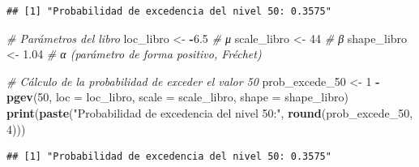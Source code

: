 \documentclass[
  20pt,
]{book}
\newenvironment{Shaded}{\begin{snugshade}}{\end{snugshade}}
\newcommand{\AttributeTok}[1]{\textcolor[rgb]{0.13,0.29,0.53}{#1}}
\newcommand{\CommentTok}[1]{\textcolor[rgb]{0.56,0.35,0.01}{\textit{#1}}}
\newcommand{\DecValTok}[1]{\textcolor[rgb]{0.00,0.00,0.81}{#1}}
\newcommand{\FloatTok}[1]{\textcolor[rgb]{0.00,0.00,0.81}{#1}}
\newcommand{\FunctionTok}[1]{\textcolor[rgb]{0.13,0.29,0.53}{\textbf{#1}}}
\newcommand{\NormalTok}[1]{#1}
\newcommand{\OtherTok}[1]{\textcolor[rgb]{0.56,0.35,0.01}{#1}}
\newcommand{\SpecialCharTok}[1]{\textcolor[rgb]{0.81,0.36,0.00}{\textbf{#1}}}
\newcommand{\StringTok}[1]{\textcolor[rgb]{0.31,0.60,0.02}{#1}}
\theoremstyle{definition}
\theoremstyle{definition}
\theoremstyle{definition}
\theoremstyle{definition}
\theoremstyle{remark}
\begin{document}
\begin{verbatim}
## [1] "Probabilidad de excedencia del nivel 50: 0.3575"
\end{verbatim}

\begin{Shaded}
\begin{Highlighting}[]
\CommentTok{\# Parámetros del libro}
\NormalTok{loc\_libro }\OtherTok{\textless{}{-}} \SpecialCharTok{{-}}\FloatTok{6.5}    \CommentTok{\# μ}
\NormalTok{scale\_libro }\OtherTok{\textless{}{-}} \DecValTok{44}     \CommentTok{\# β}
\NormalTok{shape\_libro }\OtherTok{\textless{}{-}} \FloatTok{1.04}   \CommentTok{\# α (parámetro de forma positivo, Fréchet)}

\CommentTok{\# Cálculo de la probabilidad de exceder el valor 50}
\NormalTok{prob\_excede\_50 }\OtherTok{\textless{}{-}} \DecValTok{1} \SpecialCharTok{{-}} \FunctionTok{pgev}\NormalTok{(}\DecValTok{50}\NormalTok{, }\AttributeTok{loc =}\NormalTok{ loc\_libro, }\AttributeTok{scale =}\NormalTok{ scale\_libro, }\AttributeTok{shape =}\NormalTok{ shape\_libro)}
\FunctionTok{print}\NormalTok{(}\FunctionTok{paste}\NormalTok{(}\StringTok{"Probabilidad de excedencia del nivel 50:"}\NormalTok{, }\FunctionTok{round}\NormalTok{(prob\_excede\_50, }\DecValTok{4}\NormalTok{)))}
\end{Highlighting}
\end{Shaded}

\begin{verbatim}
## [1] "Probabilidad de excedencia del nivel 50: 0.3575"
\end{verbatim}
\end{document}
